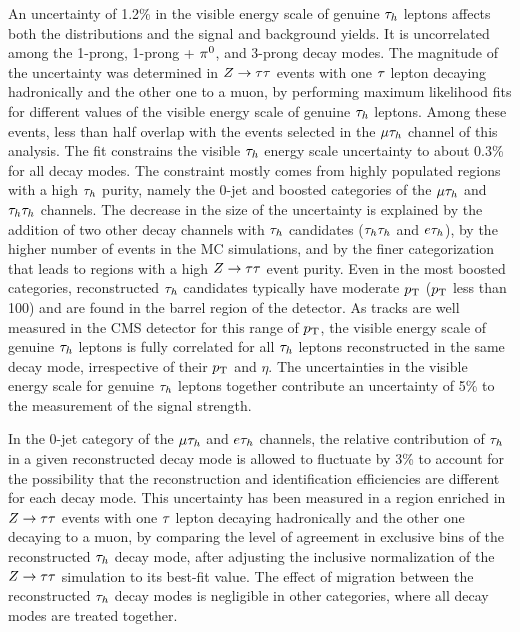 An uncertainty of 1.2\% in the visible energy scale of genuine $\tau_{h}$ leptons affects both the distributions and the
signal and background yields. It is uncorrelated among the 1-prong, 1-prong + $\pi^{0}$, and
3-prong decay modes.
The magnitude of the uncertainty was determined in $Z\to\tau\tau$ events with one $\tau$ lepton decaying hadronically and the other one to a muon, by performing maximum likelihood fits for different values of the visible energy scale of genuine $\tau_{h}$ leptons. Among these events, less than half overlap with the events selected in the $\mu\tau_{h}$ channel of this analysis. The fit constrains the visible $\tau_{h}$ energy scale uncertainty to about
0.3\% for all decay modes. The constraint mostly comes from highly populated regions with a high $\tau_{h}$ purity, namely the 0-jet and boosted categories of the $\mu\tau_{h}$ and $\tau_{h}\tau_{h}$ channels. The decrease in the size of the uncertainty is explained by the addition of two other decay channels
with $\tau_{h}$ candidates ($\tau_{h}\tau_{h}$ and $e\tau_{h}$), by the higher number of events in the MC simulations, and by the finer categorization that leads to regions with a high $Z\to\tau\tau$ event purity.
Even in the most boosted categories, reconstructed $\tau_{h}$ candidates typically have moderate $p_\mathrm{T}$ ($p_\mathrm{T}$ less than 100\GeV) and are
found in the barrel region of the detector. As tracks are well measured in the CMS detector for this range of $p_\mathrm{T}$,
the visible energy scale of genuine $\tau_{h}$ leptons is fully correlated for all $\tau_{h}$ leptons reconstructed in the same decay mode, irrespective of their $p_\mathrm{T}$ and $\eta$. The uncertainties in the visible energy scale for genuine $\tau_{h}$ leptons together contribute an uncertainty of 5\% to the measurement of the signal strength.

In the 0-jet category of the $\mu\tau_{h}$ and $e\tau_{h}$ channels, the relative contribution of $\tau_{h}$ in a given
reconstructed decay mode is allowed to fluctuate by 3\% to account for the possibility that the reconstruction and
identification efficiencies are different for each decay mode. This uncertainty has been measured in a region enriched in $Z\to\tau\tau$ events with one $\tau$ lepton decaying hadronically and the other one decaying to a muon, by comparing the level of agreement in exclusive bins of the reconstructed $\tau_{h}$ decay mode, after adjusting the inclusive normalization of the $Z\to\tau\tau$ simulation to its best-fit value. The effect of migration between the reconstructed $\tau_{h}$ decay modes is negligible in other categories, where
all decay modes are treated together.

